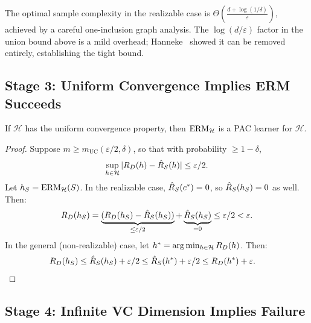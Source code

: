 \begin{remark}
\label{rmk:hanneke}
The optimal sample complexity in the realizable case is
$\Theta\!\left(\frac{d + \log(1/\delta)}{\varepsilon}\right)$, achieved by a
careful one-inclusion graph analysis.  The $\log(d/\varepsilon)$ factor in the
union bound above is a mild overhead; Hanneke~\cite{Hanneke2016} showed it can
be removed entirely, establishing the tight bound.
\end{remark}



\subsection{Stage 3: Uniform Convergence Implies ERM Succeeds}
\label{sec:erm-succeeds}

\begin{prop}
\label{prop:erm-pac}
If $\mathcal{H}$ has the uniform convergence property, then $\mathrm{ERM}_\mathcal{H}$
is a PAC learner for $\mathcal{H}$.
\end{prop}

\begin{proof}
Suppose $m \geq m_{\mathrm{UC}}(\varepsilon/2, \delta)$, so that with
probability $\geq 1 - \delta$,
\[
  \sup_{h \in \mathcal{H}} |R_D(h) - \hat{R}_S(h)| \leq \varepsilon/2.
\]
Let $h_S = \mathrm{ERM}_\mathcal{H}(S)$.  In the realizable case, $\hat{R}_S(c^*) =
0$, so $\hat{R}_S(h_S) = 0$ as well.  Then:
\[
  R_D(h_S)
  = \underbrace{(R_D(h_S) - \hat{R}_S(h_S))}_{\leq \varepsilon/2}
  + \underbrace{\hat{R}_S(h_S)}_{= 0}
  \leq \varepsilon/2 < \varepsilon.
\]
In the general (non-realizable) case, let $h^* = \arg\min_{h \in \mathcal{H}}
R_D(h)$.  Then:
\begin{align*}
R_D(h_S) &\leq \hat{R}_S(h_S) + \varepsilon/2
  \leq \hat{R}_S(h^*) + \varepsilon/2
  \leq R_D(h^*) + \varepsilon. \qedhere
\end{align*}
\end{proof}



\subsection{Stage 4: Infinite VC Dimension Implies Failure}
\label{sec:converse}

